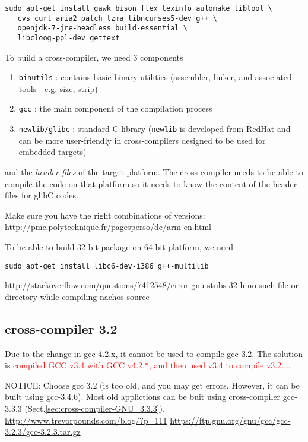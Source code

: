 \begin{verbatim}
sudo apt-get install gawk bison flex texinfo automake libtool \
   cvs curl aria2 patch lzma libncurses5-dev g++ \
   openjdk-7-jre-headless build-essential \
   libcloog-ppl-dev gettext
\end{verbatim}

To build a cross-compiler, we need 3 components
\begin{enumerate}
  \item \verb!binutils! : contains basic binary utilities (assembler, linker,
  and associated tools - e.g. size, strip)
  
  \item \verb!gcc! : the main component of the compilation process
  
  \item \verb!newlib/glibc! : standard C library (\verb!newlib! is developed
  from RedHat and can be more user-friendly in cross-compilers designed to be
  used for embedded targets)
  
\end{enumerate}
and the {\it header files} of the target platform. The cross-compiler needs to
be able to compile the code on that platform so it needs to know the content of
the header files for glibC codes. 


Make sure you have the right combinations of versions:
\url{http://pmc.polytechnique.fr/pagesperso/dc/arm-en.html}


To be able to build 32-bit package on 64-bit platform, we need
\begin{verbatim}
sudo apt-get install libc6-dev-i386 g++-multilib
\end{verbatim}
\url{http://stackoverflow.com/questions/7412548/error-gnu-stubs-32-h-no-such-file-or-directory-while-compiling-nachos-source}

\subsection{cross-compiler 3.2}
\label{sec:cross-compiler-GNU_3.2}

Due to the change in gcc 4.2.x, it cannot be used to compile gcc 3.2. The
solution is \textcolor{red}{compiled GCC v3.4 with GCC v4.2.*, and then used
v3.4 to compile v3.2...}.

NOTICE: Choose gcc 3.2 (is too old, and you may get errors. However, it can be
built using gcc-3.4.6). Most old applictions can be buit using
cross-compiler gcc-3.3.3 (Sect.\ref{sec:cross-compiler-GNU_3.3.3}).
\url{http://www.trevorpounds.com/blog/?p=111}
\url{https://ftp.gnu.org/gnu/gcc/gcc-3.2.3/gcc-3.2.3.tar.gz}

